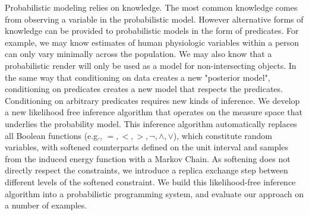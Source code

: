 






Probabilistic modeling relies on knowledge. The most common
knowledge comes from observing a variable in the probabilistic model.
However alternative forms of knowledge can be provided to
probabilistic models in the form of predicates. For example,
we may know estimates of human physiologic variables within a person
can only vary minimally across the population. We may also know
that a probabilistic render will only be used as a model
for non-intersecting objects. In the same way that conditioning
on data creates a new "posterior model", conditioning on predicates
creates a new model that respects the predicates. Conditioning on
arbitrary predicates requires new kinds of inference. We develop
a new likelihood free inference algorithm that operates on the
measure space that underlies the probability model.
This inference algorithm automatically replaces 
all Boolean functions (e.g., $=, <, >, \neg, \land, \lor$), which 
constitute random variables, with softened counterparts defined on the 
unit interval and samples from the induced energy function with a Markov
Chain. As softening does not directly respect the constraints, we introduce
a replica exchange step between different levels of the softened constraint.
We build this likelihood-free inference algorithm into a probabilistic programming system, and evaluate our approach on a number of examples. 